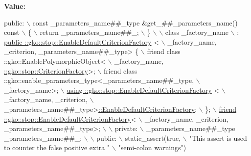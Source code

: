 {\bfseries Value\+:}
\begin{DoxyCode}
\textcolor{keyword}{public}:                                                                      \(\backslash\)
    const \_parameters\_name##\_type &get\_##\_parameters\_name() const            \(\backslash\)
    \{                                                                        \(\backslash\)
        return \_parameters\_name##\_;                                          \(\backslash\)
    \}                                                                        \(\backslash\)
                                                                             \(\backslash\)
    class \_factory\_name                                                      \(\backslash\)
        : \hyperlink{group__stop_gab045b6fd7571f3234d9a63a5ee5a2252}{public ::gko::stop::EnableDefaultCriterionFactory}
      <                 \(\backslash\)
              \_factory\_name, \_criterion, \_parameters\_name##\_type> \{          \(\backslash\)
        friend class ::gko::EnablePolymorphicObject<                         \(\backslash\)
            \_factory\_name, \hyperlink{classgko_1_1AbstractFactory}{::gko::stop::CriterionFactory}>;                   \(\backslash\)
        friend class ::gko::enable\_parameters\_type<\_parameters\_name##\_type,  \(\backslash\)
                                                   \_factory\_name>;           \hyperlink{group__stop_gab045b6fd7571f3234d9a63a5ee5a2252}{\(\backslash\)}
\hyperlink{group__stop_gab045b6fd7571f3234d9a63a5ee5a2252}{        using ::gko::stop::EnableDefaultCriterionFactory}
      <                    \(\backslash\)
            \_factory\_name, \_criterion,                                       \(\backslash\)
            \_parameters\_name##\_type>\hyperlink{group__stop_gab045b6fd7571f3234d9a63a5ee5a2252}{::EnableDefaultCriterionFactory};        
       \(\backslash\)
    \};                                                                       \hyperlink{group__stop_gab045b6fd7571f3234d9a63a5ee5a2252}{\(\backslash\)}
\hyperlink{group__stop_gab045b6fd7571f3234d9a63a5ee5a2252}{    friend ::gko::stop::EnableDefaultCriterionFactory}<
                             \(\backslash\)
        \_factory\_name, \_criterion, \_parameters\_name##\_type>;                 \(\backslash\)
                                                                             \(\backslash\)
private:                                                                     \(\backslash\)
    \_parameters\_name##\_type \_parameters\_name##\_;                             \(\backslash\)
                                                                             \(\backslash\)
public:                                                                      \(\backslash\)
    static\_assert(\textcolor{keyword}{true},                                                      \(\backslash\)
                  \textcolor{stringliteral}{"This assert is used to counter the false positive extra "} \(\backslash\)
                  \textcolor{stringliteral}{"semi-colon warnings"})
\end{DoxyCode}


